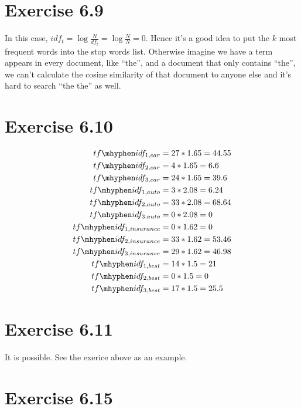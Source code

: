 \documentclass[11pt]{article} %
\begin{document}
\section*{Exercise 6.9}

In this case, $idf_t = \log{\frac{N}{df_t}} = \log{\frac{N}{N}} = 0$. Hence it's a good idea to put the $k$ most frequent words into the stop words list. Otherwise imagine we have a term appears in every document, like ``the'', and a  document that only contains ``the'', we can't calculate the cosine similarity of that document to anyone else and it's hard to search ``the the'' as well.

\section*{Exercise 6.10}

\begin{align*}
    tf\mhyphen idf_{1, car} &= 27 * 1.65 = 44.55\\
    tf\mhyphen idf_{2, car} &= 4 * 1.65 = 6.6\\
    tf\mhyphen idf_{3, car} &= 24 * 1.65 = 39.6\\
    tf\mhyphen idf_{1, auto} &= 3 * 2.08 = 6.24\\
    tf\mhyphen idf_{2, auto} &= 33 * 2.08 = 68.64\\
    tf\mhyphen idf_{3, auto} &= 0 * 2.08 = 0\\
    tf\mhyphen idf_{1, insurance} &= 0 * 1.62 = 0\\
    tf\mhyphen idf_{2, insurance} &= 33 * 1.62 = 53.46\\
    tf\mhyphen idf_{3, insurance} &= 29 * 1.62 = 46.98\\
    tf\mhyphen idf_{1, best} &= 14 * 1.5 = 21\\
    tf\mhyphen idf_{2, best} &= 0 * 1.5 = 0\\
    tf\mhyphen idf_{3, best} &= 17 * 1.5 = 25.5
\end{align*}

\section*{Exercise 6.11}

It is possible. See the exerice above as an example.

\section*{Exercise 6.15}
\end{document}
